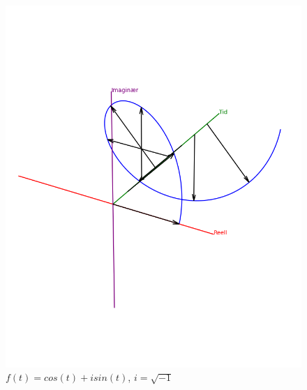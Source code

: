 \documentclass{article}
\begin{document}
            \begin{figure}[H]
                \centering
                \begin{minipage}[c]{0.45\textwidth}
                    \centering
                    \includegraphics[width = 1\textwidth]{Bilder/BasisEksempelFunksjonMedVektorer.png}
                    \caption{\(f(t) = cos(t) + isin(t)\), \(i = \sqrt{-1}\)}
                    \label{fig:BasisEksempelFunksjonMedVektorer}
                \end{minipage}
                \hfill
                \begin{minipage}[c]{0.45\textwidth}
                    \centering

\end{minipage}
\end{figure}
\end{document}

